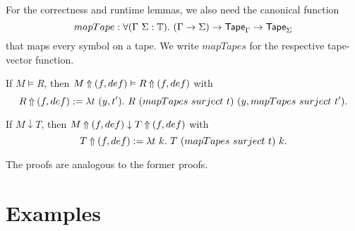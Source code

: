 For the correctness and runtime lemmas, we also need the canonical function
\[
  mapTape:\forall (\Gamma~\Sigma:\mathbb{T}).~(\Gamma\rightarrow\Sigma)\rightarrow\textsf{Tape}_\Gamma\rightarrow\textsf{Tape}_\Sigma
\]
that maps every symbol on a tape.  We write $mapTapes$ for the respective tape-vector function.

\begin{lemma}
  \label{lem:LiftAlphabet_Realise}
  If $M \vDash R$, then $M \mathbin{\Uparrow} (f,def) \vDash R \mathbin{\Uparrow} (f,def)$ with
  \[
    R \mathbin{\Uparrow} (f,def) := \lambda t~(y, t').~R~(mapTapes~surject~t)~(y, mapTapes~surject~t').
  \]
\end{lemma}

\begin{lemma}
  \label{lem:LiftAlphabet_TerminatesIn}
  If $M \downarrow T$, then $M \mathbin{\Uparrow} (f,def) \downarrow T \mathbin{\Uparrow} (f,def)$ with
  \[
    T \mathbin{\Uparrow} (f,def) := \lambda t~k.~T~(mapTapes~surject~t)~k.
  \]
\end{lemma}

The proofs are analogous to the former proofs.





\section{Examples}
\label{sec:lifting-examples}

\todo{}


